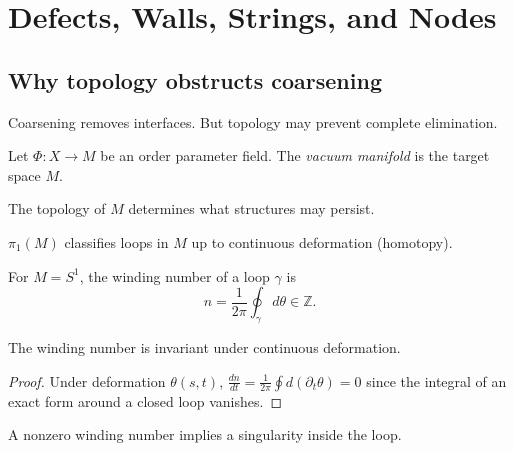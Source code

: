 
\chapter{Defects, Walls, Strings, and Nodes}
\label{ch:defects}

\section{Why topology obstructs coarsening}

Coarsening removes interfaces.
But topology may prevent complete elimination.

\begin{definition}
  Let $\Phi : X \to M$ be an order parameter field.
  The \emph{vacuum manifold} is the target space $M$.
\end{definition}

The topology of $M$ determines what structures may persist.

\begin{definition}
  $\pi_1(M)$ classifies loops in $M$ up to continuous
  deformation (homotopy).
\end{definition}

\begin{definition}
  For $M = S^1$, the winding number of a loop $\gamma$ is
  \[
    n = \frac{1}{2\pi}\oint_\gamma d\theta \in \mathbb{Z}.
  \]
\end{definition}

\begin{proposition}
  The winding number is invariant under continuous deformation.
\end{proposition}

\begin{proof}
  Under deformation $\theta(s,t)$,
  $\frac{dn}{dt} = \frac{1}{2\pi}\oint d(\partial_t\theta) = 0$
  since the integral of an exact form around a closed loop
  vanishes.
\end{proof}

\begin{theorem}
  \label{thm:top-singular}
  A nonzero winding number implies a singularity inside the loop.
\end{theorem}

